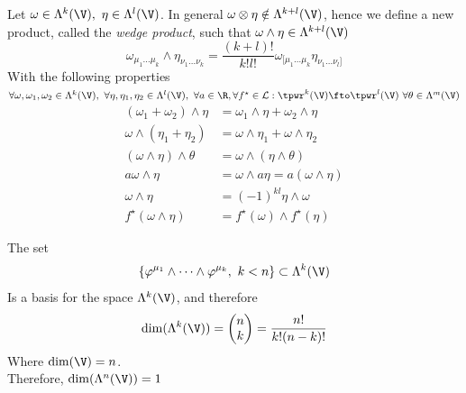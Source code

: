 \documentclass[../mmf.tex]{subfiles}
\begin{document}
\begin{dfn}
	Let $\omega\in\Lambda^k(\V),\ \eta\in\Lambda^l(\V)$. In general $\omega\otimes\eta\notin\Lambda^{k+l}(\V)$, hence we define a new product, called the \textit{wedge product}, such that $\omega\wedge\eta\in\Lambda^{k+l}(\V)$
	\begin{equation}
		\omega_{\mu_1\ldots\mu_k}\wedge\eta_{\nu_1\ldots\nu_k}=\frac{(k+l)!}{k!l!}\omega_{[\mu_1\ldots\mu_k}\eta_{\nu_1\ldots\nu_l]}
		\label{eq:wedgreprod}
	\end{equation}
	With the following properties\\
	$\forall\omega,\omega_1,\omega_2\in\Lambda^k(\V),\ \forall\eta,\eta_1,\eta_2\in\Lambda^l(\V),\ \forall a\in\R,\forall f^\star\in\mathcal{L}:\tpwr^k(\V)\fto\tpwr^l(\V)\ \forall\theta\in\Lambda^m(\V)$
	\begin{equation}
		\begin{aligned}
			(\omega_1+\omega_2)\wedge\eta&=\omega_1\wedge\eta+\omega_2\wedge\eta\\
			\omega\wedge(\eta_1+\eta_2)&=\omega\wedge\eta_1+\omega\wedge\eta_2\\
			(\omega\wedge\eta)\wedge\theta&=\omega\wedge(\eta\wedge\theta)\\
			a\omega\wedge\eta&=\omega\wedge a\eta=a(\omega\wedge\eta)\\
			\omega\wedge\eta&=(-1)^{kl}\eta\wedge\omega\\
			f^\star(\omega\wedge\eta)&=f^\star(\omega)\wedge f^\star(\eta)
		\end{aligned}
		\label{eq:wedgeprod}
	\end{equation}
\end{dfn}
\begin{thm}
	The set
	\begin{equation}
		\{\varphi^{\mu_1}\wedge\cdots\wedge\varphi^{\mu_k},\ k<n\}\subset\Lambda^k(\V)
		\label{eq:basislambdabig}
	\end{equation}
	Is a basis for the space $\Lambda^k(\V)$, and therefore
	\begin{equation*}
		\dim(\Lambda^k(\V))=\begin{pmatrix}n\\k\end{pmatrix}=\frac{n!}{k!(n-k)!}
	\end{equation*}
	Where $\dim(\V)=n$.\\
	Therefore, $\dim(\Lambda^n(\V))=1$
\end{thm}
\end{document}
